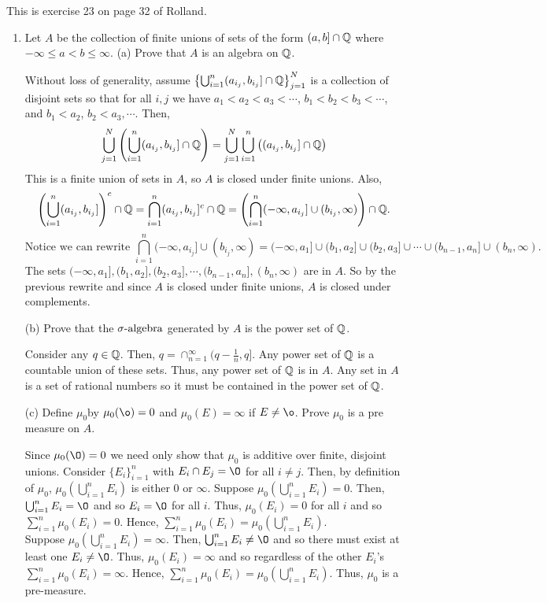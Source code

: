 This is exercise 23 on page 32 of Rolland.
\begin{enumerate}
\item Let $A$ be the collection of finite unions of sets of the form $(a, b] \cap {\mathbb Q}$ where $-\infty \leq a < b \leq \infty$.
\subitem(a) Prove that $A$ is an algebra on ${\mathbb Q}$.
\begin{pf}
Without loss of generality, assume $\left\{\bigcup_{i=1}^n (a_{i_j}, b_{i_j}] \cap {\mathbb Q} \right\}_{j=1}^N$ is a collection of disjoint sets so that for all $i, j$ we have $a_1 < a_2 < a_3 < \cdots$, $b_1 < b_2 < b_3 < \cdots$, and $b_1< a_2$, $b_2<a_3, \cdots$. Then,
\[
\bigcup_{j=1}^N\left( \bigcup_{i=1}^n (a_{i_j}, b_{i_j}] \cap {\mathbb Q}  \right)=\bigcup_{j=1}^N \bigcup_{i=1}^n \left((a_{i_j}, b_{i_j}] \cap {\mathbb Q}  \right)
\]
This is a finite union of sets in $A$, so $A$ is closed under finite unions. Also,
\[
\left( \bigcup_{i=1}^n (a_{i_j}, b_{i_j}]  \right)^c \cap {\mathbb Q}=\bigcap_{i=1}^n (a_{i_j}, b_{i_j}]^c \cap {\mathbb Q}=\left(\bigcap_{i=1}^n (-\infty, a_{i_j}] \cup (b_{i_j}, \infty) \right) \cap {\mathbb Q}. 
\] 
\[
\text{Notice we can rewrite } \bigcap_{i=1}^n (-\infty, a_{i_j}] \cup (b_{i_j}, \infty) =(-\infty, a_1]\cup (b_1, a_2] \cup (b_2, a_3] \cup  \cdots \cup (b_{n-1}, a_n] \cup (b_n, \infty). 
\]
The sets $(-\infty, a_1], (b_1, a_2], (b_2, a_3],  \cdots, (b_{n-1}, a_n], (b_n, \infty)$ are in $A$. So by the previous rewrite and since $A$ is closed under finite unions, $A$ is closed under complements. 
\end{pf}
\subitem(b) Prove that the ${\sigma}\text{-algebra}$ generated by $A$ is the power set of ${\mathbb Q}$.
\begin{pf}
	Consider any $q \in {\mathbb Q}$. Then, $q = \cap_{n=1}^\infty (q - \frac{1}{n}, q]$. Any power set of ${\mathbb Q}$ is a countable union of these sets. Thus, any power set of ${\mathbb Q}$ is in $A$. Any set in $A$ is a set of rational numbers so it must be contained in the power set of ${\mathbb Q}$. 
\end{pf}
 \subitem(c) Define $\mu_0$by $\mu_0(\o)=0$ and $\mu_0(E)= \infty$ if $E \neq \o$. Prove $\mu_0$ is a pre measure on $A$. 	
 \begin{pf}
 Since $\mu_0(\O)=0$ we need only show that $\mu_0$ is additive over finite, disjoint unions. Consider $\{E_i\}_{i=1}^n$ with $E_i \cap E_j = \O$ for all $i \neq j$. Then, by definition of $\mu_0$, $\mu_0\left( \bigcup_{i=1}^n E_i \right)$ is either $0$ or $\infty$. Suppose $\mu_0\left( \bigcup_{i=1}^n E_i \right)=0$. Then, 	$\bigcup_{i=1}^n E_i= \O$ and so $E_i=\O$ for all $i$. Thus, $\mu_0(E_i)= 0$ for all $i$ and so $\sum_{i=1}^n \mu_0 (E_i ) = 0$. Hence, $\sum_{i=1}^n \mu_0( E_i)= \mu_0\left( \bigcup_{i=1}^n E_i \right)$.\\
 Suppose $\mu_0\left( \bigcup_{i=1}^n E_i \right)=\infty$. Then, 	$\bigcup_{i=1}^n E_i\neq \O$ and so there must exist at least one $E_i \neq \O$. Thus, $\mu_0(E_i)= \infty$ and so regardless of the other $E_i$'s $\sum_{i=1}^n \mu_0 (E_i ) = \infty$. Hence, $\sum_{i=1}^n \mu_0( E_i)= \mu_0\left( \bigcup_{i=1}^n E_i \right)$. Thus, $\mu_0$ is a pre-measure. 
 \end{pf}


\end{enumerate}
